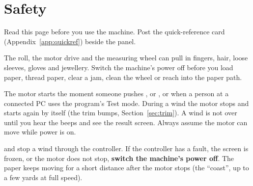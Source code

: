\chapter{Safety}\label{ch:safety}

Read this page before you use the machine. Post the quick-reference card
(Appendix~\ref{app:quickref}) beside the panel.

\begin{warning}
The roll, the motor drive and the measuring wheel can pull in fingers, hair,
loose sleeves, gloves and jewellery. Switch the machine's power off before you
load paper, thread paper, clear a jam, clean the wheel or reach into the
paper path.
\end{warning}

\begin{warning}
The motor starts the moment someone pushes ,  or , or
when a person at a connected PC uses the program's Test mode. During a wind
the motor stops and starts again by itself (the trim bumps,
Section~\ref{sec:trim}). A wind is not over until you hear the beeps and see
the result screen. Always assume the motor can move while power is on.
\end{warning}

\begin{warning}
 and  stop a wind through the controller. If the controller
has a fault, the screen is frozen, or the motor does not stop, \textbf{switch
the machine's power off}. The paper keeps moving for a short distance after
the motor stops (the ``coast'', up to a few yards at full speed).
\end{warning}

